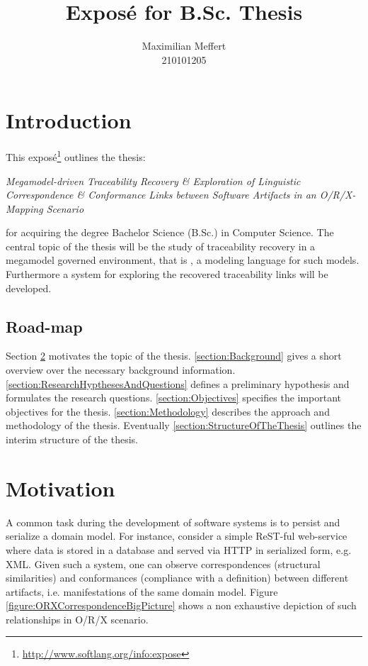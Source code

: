 \documentclass[runningheads,a4paper]{llncs}
\title{Exposé for B.Sc. Thesis}
\subtitle{\thesis}
\author{Maximilian Meffert\\210101205}
\institute{University of Koblenz-Landau}
\newcommand{\megal}{\text{MegaL}}
\newcommand{\thesis}{Megamodel-driven Traceability Recovery \& Exploration of Linguistic Correspondence \& Conformance Links between Software Artifacts in an O/R/X-Mapping Scenario}
\begin{document}
\maketitle
%


\section{Introduction}
This exposé\footnote{\url{http://www.softlang.org/info:expose}} outlines the thesis:
\begin{center}
\it
\thesis
\end{center}
for acquiring the degree Bachelor Science (B.Sc.) in Computer Science.
The central topic of the thesis will be the study of traceability recovery in a megamodel governed environment, that is \megal, a modeling language for such models. Furthermore a system for exploring the recovered traceability links will be developed.

\subsection{Road-map}
Section \ref{section:Motivation} motivates the topic of the thesis.
\ref{section:Background} gives a short overview over the necessary background information.
\ref{section:ResearchHypthesesAndQuestions} defines a preliminary hypothesis and formulates the research questions.
\ref{section:Objectives} specifies the important objectives for the thesis.
\ref{section:Methodology} describes the approach and methodology of the thesis.
Eventually \ref{section:StructureOfTheThesis} outlines the interim structure of the thesis.


\section{Motivation}
\label{section:Motivation}
A common task during the development of software systems is to persist and serialize a domain model.
For instance, consider a simple ReST-ful web-service where data is stored in a database and served via HTTP in serialized form, e.g. XML.
Given such a system, one can observe correspondences (structural similarities) and conformances (compliance with a definition) between different artifacts, i.e. manifestations of the same domain model.
Figure \ref{figure:ORXCorrespondenceBigPicture} shows a non exhaustive depiction of such relationships in O/R/X scenario.
\end{document}
